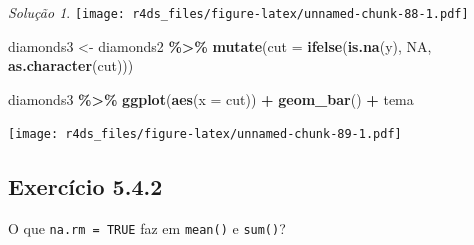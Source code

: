 \documentclass[
]{latex/krantz}
\newenvironment{Shaded}{\begin{snugshade}}{\end{snugshade}}
\newcommand{\AttributeTok}[1]{\textcolor[rgb]{0.13,0.29,0.53}{#1}}
\newcommand{\ConstantTok}[1]{\textcolor[rgb]{0.56,0.35,0.01}{#1}}
\newcommand{\FunctionTok}[1]{\textcolor[rgb]{0.13,0.29,0.53}{\textbf{#1}}}
\newcommand{\NormalTok}[1]{#1}
\newcommand{\OtherTok}[1]{\textcolor[rgb]{0.56,0.35,0.01}{#1}}
\newcommand{\SpecialCharTok}[1]{\textcolor[rgb]{0.81,0.36,0.00}{\textbf{#1}}}
\theoremstyle{definition}
\theoremstyle{definition}
\theoremstyle{definition}
\theoremstyle{definition}
\theoremstyle{remark}
\newtheorem*{solution}{Solução}
\begin{document}
\begin{solution}
\texttt{[image: r4ds\_files/figure-latex/unnamed-chunk-88-1.pdf]}

\begin{Shaded}
\begin{Highlighting}[]
\NormalTok{diamonds3 }\OtherTok{\textless{}{-}}\NormalTok{ diamonds2 }\SpecialCharTok{\%\textgreater{}\%}
                \FunctionTok{mutate}\NormalTok{(}\AttributeTok{cut =} \FunctionTok{ifelse}\NormalTok{(}\FunctionTok{is.na}\NormalTok{(y), }\ConstantTok{NA}\NormalTok{, }\FunctionTok{as.character}\NormalTok{(cut)))}

\NormalTok{diamonds3 }\SpecialCharTok{\%\textgreater{}\%}    
    \FunctionTok{ggplot}\NormalTok{(}\FunctionTok{aes}\NormalTok{(}\AttributeTok{x =}\NormalTok{ cut)) }\SpecialCharTok{+}
        \FunctionTok{geom\_bar}\NormalTok{() }\SpecialCharTok{+}
\NormalTok{        tema}
\end{Highlighting}
\end{Shaded}

\texttt{[image: r4ds\_files/figure-latex/unnamed-chunk-89-1.pdf]}
\end{solution}

\hypertarget{exr5-4-2}{%
\subsection*{Exercício 5.4.2}\label{exr5-4-2}}

O que \texttt{na.rm\ =\ TRUE} faz em \texttt{mean()} e \texttt{sum()}?
\end{document}
